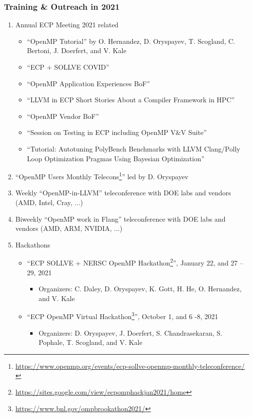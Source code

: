 \subsubsection{ Training \& Outreach in 2021}\label{subsubsect:train_outreach}

\begin{enumerate}
\item Annual ECP Meeting 2021 related
\begin{itemize}
    \item \enquote{OpenMP Tutorial} by O. Hernandez, D. Oryspayev, T. Scogland, C. Bertoni, J. Doerfert, and V. Kale
    \item \enquote{ECP + SOLLVE COVID} 
    \item \enquote{OpenMP Application Experiences BoF} 
    \item \enquote{LLVM in ECP Short Stories About a Compiler Framework in HPC} 
    \item \enquote{OpenMP Vendor BoF}
    \item \enquote{Session on Testing in ECP including OpenMP V\&V Suite} 
    \item \enquote{Tutorial: Autotuning PolyBench Benchmarks with LLVM Clang/Polly Loop Optimization Pragmas Using Bayesian Optimization}
\end{itemize}

\item \enquote{OpenMP Users Monthly Telecons\footnote{\url{https://www.openmp.org/events/ecp-sollve-openmp-monthly-teleconference/}}} led by D. Oryspayev

\item Weekly \enquote{OpenMP-in-LLVM} teleconference with DOE labs and vendors (AMD, Intel, Cray, ...)

\item Biweekly \enquote{OpenMP work in Flang} teleconference with DOE labs and vendors (AMD, ARM, NVIDIA, ...)

\item Hackathons

\begin{itemize}
    \item \enquote{ECP SOLLVE + NERSC OpenMP Hackathon\footnote{\url{https://sites.google.com/view/ecpomphackjan2021/home}}}, January 22, and 27 – 29, 2021
    \begin{itemize}
        \item Organizers: C. Daley, D. Oryspayev, K. Gott, H. He, O. Hernandez, and V. Kale 
    \end{itemize}
    \item \enquote{ECP OpenMP Virtual Hackathon\footnote{\url{https://www.bnl.gov/ompbrookathon2021/}}}, October 1, and 6 -8, 2021
    \begin{itemize}
        \item Organizers: D. Oryspayev, J. Doerfert, S. Chandrasekaran, S. Pophale, T. Scogland, and V. Kale  
    \end{itemize}
\end{itemize}


\end{enumerate}
